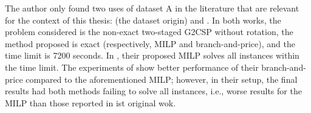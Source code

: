 
The author only found two uses of dataset A in the literature that are relevant for the context of this thesis: \citet{macedo:2010} (the dataset origin) and \citet{mrad:2013}.
In both works, the problem considered is the non-exact two-staged G2CSP without rotation, the method proposed is exact (respectively, MILP and branch-and-price), and the time limit is 7200 seconds.
In \citet{macedo:2010}, their proposed MILP solves all instances within the time limit.
The experiments of \citet{mrad:2013} show better performance of their branch-and-price compared to the aforementioned MILP; however, in their setup, the final results had both methods failing to solve all instances, i.e., worse results for the MILP than those reported in ist original wok.

